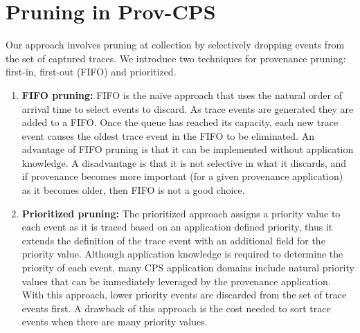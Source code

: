 \section{Pruning in Prov-CPS} \label{Pruning}
Our approach involves pruning at collection by selectively dropping events from the set of captured traces. We introduce two techniques for provenance pruning: first-in, first-out (FIFO) and prioritized.  
\begin{enumerate}


\item\textbf{FIFO pruning:}  
  FIFO is the na\"ive approach that uses the natural order of arrival time to select events to discard. As trace events are generated they are added to a FIFO. Once the queue has reached its capacity, each new trace event causes the oldest trace event in the FIFO to be eliminated. An advantage of FIFO pruning is that it can be implemented without application knowledge. A disadvantage is that it is not selective in what it discards, and if provenance becomes more important (for a given provenance application) as it becomes older, then FIFO is not a good choice.

\item \textbf{Prioritized pruning:}
The prioritized approach assigns a priority value to each event as it is traced based on an application defined priority, thus it extends the definition of the trace event with an additional field for the priority value. Although application knowledge is required to determine the priority of each event, many CPS application domains include natural priority values that can be immediately leveraged by the provenance application. With this approach, lower priority events are discarded from the set of trace events first. A drawback of this approach is the cost needed to sort trace events when there are many priority values.

\end{enumerate}

